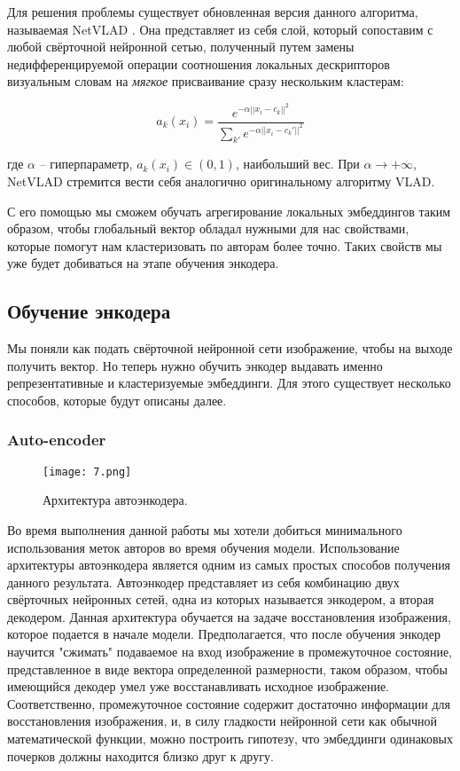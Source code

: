     Для решения проблемы существует обновленная версия данного алгоритма, называемая NetVLAD \cite{netvlad}. Она представляет из себя слой, который сопоставим с любой свёрточной нейронной сетью, полученный путем замены недифференцируемой операции соотношения локальных дескрипторов визуальным словам на \textit{мягкое} присваивание сразу нескольким кластерам:
    
    $$
        a_k(x_i) = \frac{e^{- \alpha || x_i - c_k ||^2}}{\sum_{k'} e^{- \alpha || x_i - c_k' ||^2}}
    $$
    \smallskip

    \noindent
    где $\alpha$ -- гиперпараметр, $a_k(x_i) \in (0, 1)$, наибольший вес. При $\alpha \rightarrow + \infty$, \: NetVLAD стремится вести себя аналогично оригинальному алгоритму VLAD.

    С его помощью мы сможем обучать агрегирование локальных эмбеддингов таким образом, чтобы глобальный вектор обладал нужными для нас свойствами, которые помогут нам кластеризовать по авторам более точно. Таких свойств мы уже будет добиваться на этапе обучения энкодера.

\subsection{Обучение энкодера}

    Мы поняли как подать свёрточной нейронной сети изображение, чтобы на выходе получить вектор. Но теперь нужно обучить энкодер выдавать именно репрезентативные и кластеризуемые эмбеддинги. Для этого существует несколько способов, которые будут описаны далее.

\subsubsection{Auto-encoder}

    \begin{figure}[htbp]
        \centering
        \texttt{[image: 7.png]}
        \caption{Архитектура автоэнкодера.}
        \label{fig:autoencoder}
    \end{figure}

    Во время выполнения данной работы мы хотели добиться минимального использования меток авторов во время обучения модели. Использование архитектуры автоэнкодера является одним из самых простых способов получения данного результата. Автоэнкодер представляет из себя комбинацию двух свёрточных нейронных сетей, одна из которых называется энкодером, а вторая декодером. Данная архитектура обучается на задаче восстановления изображения, которое подается в начале модели. Предполагается, что после обучения энкодер научится "сжимать" подаваемое на вход изображение в промежуточное состояние, представленное в виде вектора определенной размерности, таком образом, чтобы имеющийся декодер умел уже восстанавливать исходное изображение. Соответственно, промежуточное состояние содержит достаточно информации для восстановления изображения, и, в силу гладкости нейронной сети как обычной математической функции, можно построить гипотезу, что эмбеддинги одинаковых почерков должны находится близко друг к другу. 

